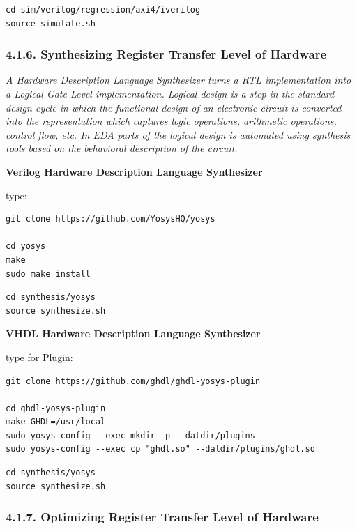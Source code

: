 \documentclass[
]{article}
\begin{document}
\begin{verbatim}
cd sim/verilog/regression/axi4/iverilog
source simulate.sh
\end{verbatim}

\hypertarget{synthesizing-register-transfer-level-of-hardware-1}{%
\subsubsection{4.1.6. Synthesizing Register Transfer Level of
Hardware}\label{synthesizing-register-transfer-level-of-hardware-1}}

\emph{A Hardware Description Language Synthesizer turns a RTL
implementation into a Logical Gate Level implementation. Logical design
is a step in the standard design cycle in which the functional design of
an electronic circuit is converted into the representation which
captures logic operations, arithmetic operations, control flow, etc. In
EDA parts of the logical design is automated using synthesis tools based
on the behavioral description of the circuit.}

\textbf{Verilog Hardware Description Language Synthesizer}

type:

\begin{verbatim}
git clone https://github.com/YosysHQ/yosys

cd yosys
make
sudo make install
\end{verbatim}

\begin{verbatim}
cd synthesis/yosys
source synthesize.sh
\end{verbatim}

\textbf{VHDL Hardware Description Language Synthesizer}

type for Plugin:

\begin{verbatim}
git clone https://github.com/ghdl/ghdl-yosys-plugin

cd ghdl-yosys-plugin
make GHDL=/usr/local
sudo yosys-config --exec mkdir -p --datdir/plugins
sudo yosys-config --exec cp "ghdl.so" --datdir/plugins/ghdl.so
\end{verbatim}

\begin{verbatim}
cd synthesis/yosys
source synthesize.sh
\end{verbatim}

\hypertarget{optimizing-register-transfer-level-of-hardware-1}{%
\subsubsection{4.1.7. Optimizing Register Transfer Level of
Hardware}\label{optimizing-register-transfer-level-of-hardware-1}}
\end{document}
